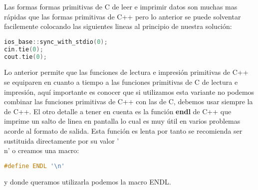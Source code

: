 Las formas formas primitivas de C de leer e imprimir datos son muchas mas rápidas que las formas primitivas de C++ pero lo anterior se puede solventar facilemente colocando las siguientes lineas al principio de nuestra solución:

\begin{lstlisting}[language=C++]
ios_base::sync_with_stdio(0);
cin.tie(0);
cout.tie(0);
\end{lstlisting}

Lo anterior permite que las funciones de lectura e impresión primitivas de C++ se equiparen en cuanto a tiempo a las funciones primitivas de C de lectura e impresión, aquí importante es conocer que si utilizamos esta variante no podemos combinar las funciones primitivas de C++ con las de C, debemos usar siempre la de C++. El otro detalle a tener en cuenta es la función \textbf{endl} de C++ que imprime un salto de linea en pantalla lo cual es muy útil en varios problemas acorde al formato de salida. Esta función es lenta por tanto se recomienda ser sustituida directamente por su valor '\\n' o creamos una macro:
\begin{lstlisting}[language=C++]
#define ENDL '\n'
\end{lstlisting}

y donde queramos utilizarla podemos la macro ENDL.

